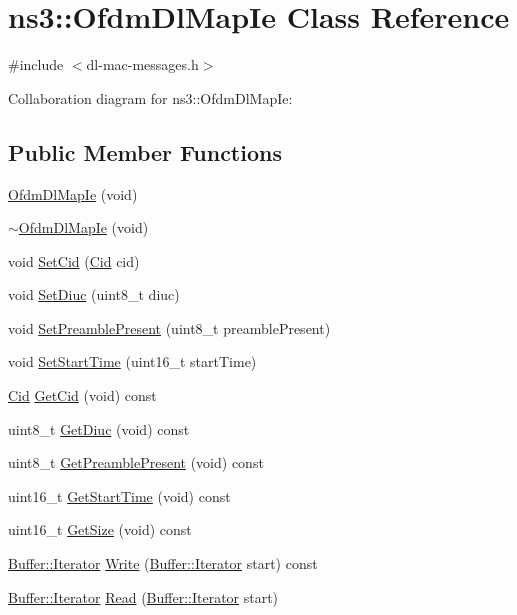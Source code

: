 \hypertarget{classns3_1_1OfdmDlMapIe}{}\section{ns3\+:\+:Ofdm\+Dl\+Map\+Ie Class Reference}
\label{classns3_1_1OfdmDlMapIe}


{\ttfamily \#include $<$dl-\/mac-\/messages.\+h$>$}



Collaboration diagram for ns3\+:\+:Ofdm\+Dl\+Map\+Ie\+:
\subsection*{Public Member Functions}
\begin{DoxyCompactItemize}
\item 
\hyperlink{classns3_1_1OfdmDlMapIe_a54ba1b98920643d9a263cbf393ddb9f3}{Ofdm\+Dl\+Map\+Ie} (void)
\item 
\hyperlink{classns3_1_1OfdmDlMapIe_a2c27f55dc3e57b8cbbd7392a84aa5955}{$\sim$\+Ofdm\+Dl\+Map\+Ie} (void)
\item 
void \hyperlink{classns3_1_1OfdmDlMapIe_a26e943ec6aaef043f437147656776690}{Set\+Cid} (\hyperlink{classns3_1_1Cid}{Cid} cid)
\item 
void \hyperlink{classns3_1_1OfdmDlMapIe_a5a15248f4ebcbad45720ff54443d0c8c}{Set\+Diuc} (uint8\+\_\+t diuc)
\item 
void \hyperlink{classns3_1_1OfdmDlMapIe_a78b98bc4dbb4b7e89bfeb27b949eea9a}{Set\+Preamble\+Present} (uint8\+\_\+t preamble\+Present)
\item 
void \hyperlink{classns3_1_1OfdmDlMapIe_a0a0b2b9e5e00d40337fceb32f64902c8}{Set\+Start\+Time} (uint16\+\_\+t start\+Time)
\item 
\hyperlink{classns3_1_1Cid}{Cid} \hyperlink{classns3_1_1OfdmDlMapIe_a3e7882b1932f3afa77df0303dd512209}{Get\+Cid} (void) const 
\item 
uint8\+\_\+t \hyperlink{classns3_1_1OfdmDlMapIe_af551a59bb73d72a20280cd69b6d6d6b2}{Get\+Diuc} (void) const 
\item 
uint8\+\_\+t \hyperlink{classns3_1_1OfdmDlMapIe_aae3e1b4170ef65872ba30a98d5620c2a}{Get\+Preamble\+Present} (void) const 
\item 
uint16\+\_\+t \hyperlink{classns3_1_1OfdmDlMapIe_ac0a32cfb3c498531353fe21dd32e46b1}{Get\+Start\+Time} (void) const 
\item 
uint16\+\_\+t \hyperlink{classns3_1_1OfdmDlMapIe_a3e845e04be29f18c4f61a0c4ae4deaff}{Get\+Size} (void) const 
\item 
\hyperlink{classns3_1_1Buffer_1_1Iterator}{Buffer\+::\+Iterator} \hyperlink{classns3_1_1OfdmDlMapIe_ae51a050fe61fef6d82bd310aada59f4f}{Write} (\hyperlink{classns3_1_1Buffer_1_1Iterator}{Buffer\+::\+Iterator} start) const 
\item 
\hyperlink{classns3_1_1Buffer_1_1Iterator}{Buffer\+::\+Iterator} \hyperlink{classns3_1_1OfdmDlMapIe_aacbfdd43a086f097988048a04c4cce36}{Read} (\hyperlink{classns3_1_1Buffer_1_1Iterator}{Buffer\+::\+Iterator} start)
\end{DoxyCompactItemize}
